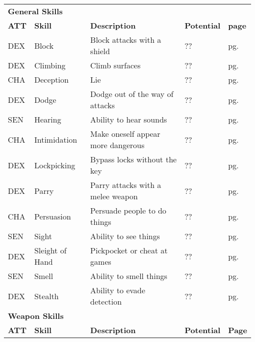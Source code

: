 


\begin{table}[h!]
    \begin{tabular}{l l l l l}
        \multicolumn{5}{l}{\bfseries{General Skills}} \\
        \bfseries{ATT} & \bfseries{Skill} & \bfseries{Description} & \bfseries{Potential} & \bfseries{page} \\
        DEX & Block & Block attacks with a shield & ?? & pg. \pageref{skill:block} \\
        DEX & Climbing & Climb surfaces & ?? & pg. \pageref{skill:climbing} \\
        CHA & Deception & Lie & ?? & pg. \pageref{skill:deception} \\
        DEX & Dodge & Dodge out of the way of attacks & ?? & pg. \pageref{skill:dodge} \\
        SEN & Hearing & Ability to hear sounds & ?? & pg. \pageref{skill:hearing} \\
        CHA & Intimidation & Make oneself appear more dangerous & ?? & pg. \pageref{skill:intimidation} \\
        DEX & Lockpicking & Bypass locks without the key & ?? & pg. \pageref{skill:lockpicking} \\
        DEX & Parry & Parry attacks with a melee weapon & ?? & pg. \pageref{skill:parry} \\
        CHA & Persuasion & Persuade people to do things & ?? & pg. \pageref{skill:persuasion} \\
        SEN & Sight & Ability to see things & ?? & pg. \pageref{skill:sight} \\
        DEX & Sleight of Hand & Pickpocket or cheat at games & ?? & pg. \pageref{skill:sleight-of-hand} \\
        SEN & Smell & Ability to smell things & ?? & pg. \pageref{skill:smell} \\
        DEX & Stealth & Ability to evade detection & ?? & pg. \pageref{skill:stealth} \\
        \multicolumn{5}{l}{\bfseries{Weapon Skills}} \\
        \bfseries{ATT} & \bfseries{Skill} & \bfseries{Description} & \bfseries{Potential} & \bfseries{Page} \\

\end{tabular}
\end{table}
